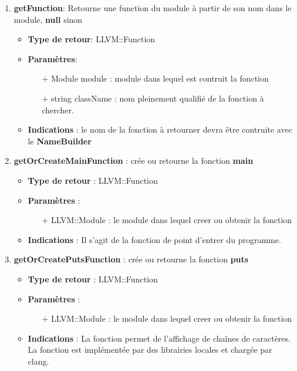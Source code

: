 \documentclass{article}
\begin{document}
\begin{enumerate}
   \item \textbf{getFunction}: Retourne une function du module à partir de son nom dans le module, \textbf{null} sinon
  \begin{itemize}
    \item \textbf{Type de retour}: LLVM::Function
    \item \textbf{Paramètres}:
    \begin{enumerate}
      \item[+] Module module : module dans lequel est contruit la fonction
      \item[+] string className : nom pleinement qualifié de la fonction à chercher.
    \end{enumerate}
    \item \textbf{Indications} : le nom de la fonction à retourner devra être contruite avec le \textbf{NameBuilder}    
  \end{itemize}

  \item \textbf{getOrCreateMainFunction} : crée ou retourne la fonction \textbf{main}
  \begin{itemize}
    \item \textbf{Type de retour} : LLVM::Function
    \item \textbf{Paramètres} :
    \begin{enumerate}
      \item[+] LLVM::Module : le module dans lequel creer ou obtenir la fonction
    \end{enumerate}
    \item \textbf{Indications} : Il s'agit de la fonction de point d'entrer du programme.      
  \end{itemize}

  \item \textbf{getOrCreatePutsFunction} : crée ou retourne la fonction \textbf{puts}
  \begin{itemize}
    \item \textbf{Type de retour} : LLVM::Function
    \item \textbf{Paramètres} :
    \begin{enumerate}
      \item[+] LLVM::Module : le module dans lequel creer ou obtenir la fonction
    \end{enumerate}
    \item \textbf{Indications} : La fonction permet de l'affichage de chaînes de caractères. La fonction est implémentée par des librairies locales et chargée par clang.    
  \end{itemize}


\end{enumerate}
\end{document}
